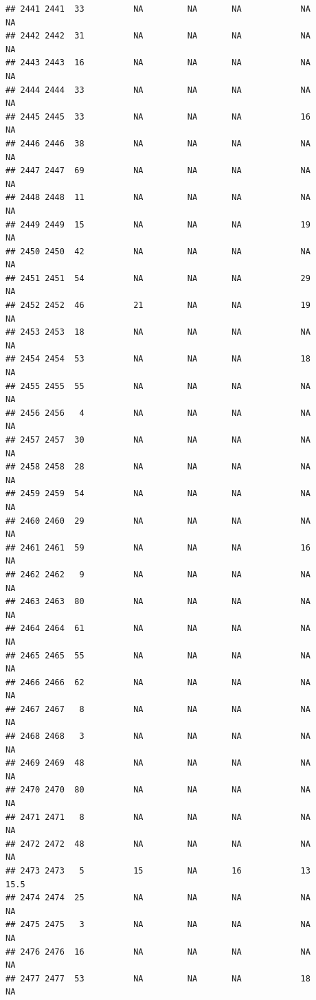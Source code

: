 \documentclass[man]{apa6}
\begin{document}
\begin{verbatim}
## 2441 2441  33          NA         NA       NA            NA       NA
## 2442 2442  31          NA         NA       NA            NA       NA
## 2443 2443  16          NA         NA       NA            NA       NA
## 2444 2444  33          NA         NA       NA            NA       NA
## 2445 2445  33          NA         NA       NA            16       NA
## 2446 2446  38          NA         NA       NA            NA       NA
## 2447 2447  69          NA         NA       NA            NA       NA
## 2448 2448  11          NA         NA       NA            NA       NA
## 2449 2449  15          NA         NA       NA            19       NA
## 2450 2450  42          NA         NA       NA            NA       NA
## 2451 2451  54          NA         NA       NA            29       NA
## 2452 2452  46          21         NA       NA            19       NA
## 2453 2453  18          NA         NA       NA            NA       NA
## 2454 2454  53          NA         NA       NA            18       NA
## 2455 2455  55          NA         NA       NA            NA       NA
## 2456 2456   4          NA         NA       NA            NA       NA
## 2457 2457  30          NA         NA       NA            NA       NA
## 2458 2458  28          NA         NA       NA            NA       NA
## 2459 2459  54          NA         NA       NA            NA       NA
## 2460 2460  29          NA         NA       NA            NA       NA
## 2461 2461  59          NA         NA       NA            16       NA
## 2462 2462   9          NA         NA       NA            NA       NA
## 2463 2463  80          NA         NA       NA            NA       NA
## 2464 2464  61          NA         NA       NA            NA       NA
## 2465 2465  55          NA         NA       NA            NA       NA
## 2466 2466  62          NA         NA       NA            NA       NA
## 2467 2467   8          NA         NA       NA            NA       NA
## 2468 2468   3          NA         NA       NA            NA       NA
## 2469 2469  48          NA         NA       NA            NA       NA
## 2470 2470  80          NA         NA       NA            NA       NA
## 2471 2471   8          NA         NA       NA            NA       NA
## 2472 2472  48          NA         NA       NA            NA       NA
## 2473 2473   5          15         NA       16            13     15.5
## 2474 2474  25          NA         NA       NA            NA       NA
## 2475 2475   3          NA         NA       NA            NA       NA
## 2476 2476  16          NA         NA       NA            NA       NA
## 2477 2477  53          NA         NA       NA            18       NA

\end{verbatim}
\end{document}
